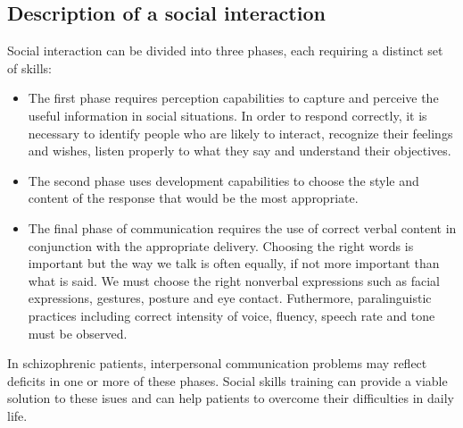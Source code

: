 \documentclass[11pt]{article}
\begin{document}
\subsection{Description of a social interaction}
Social interaction can be divided into three phases, each requiring a distinct set of skills:
\begin{itemize}
\item The first phase requires perception capabilities to capture and perceive the useful information in social situations. In order to respond correctly, it is necessary to identify people who are likely to interact, recognize their feelings and wishes, listen properly to what they say and understand their objectives.
\item The second phase uses development capabilities to choose the style and content of the response that would be the most appropriate.
\item The final phase of communication requires the use of correct verbal content in conjunction with the appropriate delivery. Choosing the right words is important but the way we talk is often equally, if not more important than what is said. We must choose the right nonverbal expressions such as facial expressions, gestures, posture and eye contact. Futhermore, paralinguistic practices including correct intensity of voice, fluency, speech rate and tone must be observed.
\end{itemize}
In schizophrenic patients, interpersonal communication problems may reflect deficits in one or more of these phases. Social skills training can provide a viable solution to these isues and can help patients to overcome their difficulties in daily life. 
\end{document}
